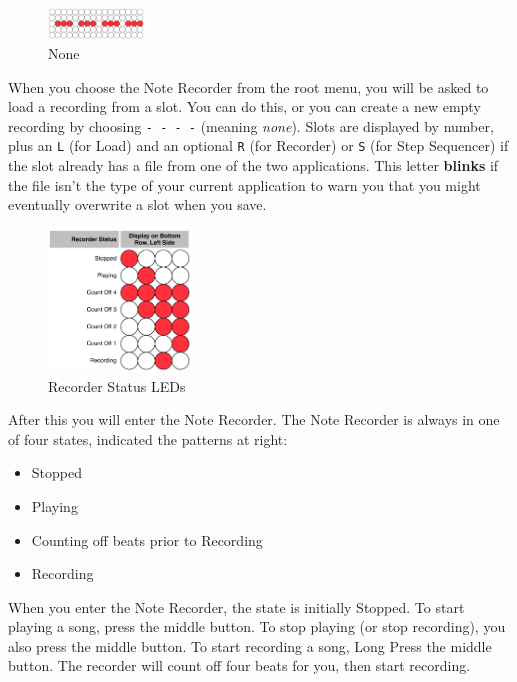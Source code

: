 \documentclass{article}
\begin{document}
\begin{figure}
\includegraphics[width=1in]{none.pdf}
\vspace{-2em}\caption{\small None}\vspace{-1em}
\label{none}
\end{figure}

When you choose the Note Recorder from the root menu, you will be asked to load a recording from a slot.  You can do this, or you can create a new empty recording by choosing \texttt{-~-~-~-} (meaning {\it none}).  Slots are displayed by number, plus an \texttt{L} (for Load) and an optional \texttt{R} (for Recorder) or \texttt{S} (for Step Sequencer) if the slot already has a file from one of the two applications.  This letter {\bf blinks} if the file isn't the type of your current application to warn you that you might eventually overwrite a slot when you save.

\begin{figure}
\includegraphics[width=1.5in]{recorderstatus.pdf}
\vspace{-2em}\caption{\small Recorder Status LEDs}\vspace{-4em}
\label{recorderstatus}
\end{figure}

After this you will enter the Note Recorder.  The Note Recorder is always in one of four states, indicated the patterns at right:

\begin{itemize}
\item Stopped
\item Playing
\item Counting off beats prior to Recording
\item Recording
\end{itemize}

When you enter the Note Recorder, the state is initially Stopped.  To start playing a song, press the middle button.  To stop playing (or stop recording), you also press the middle button.  To start recording a song, Long Press the middle button.  The recorder will count off four beats for you, then start recording.
\end{document}
